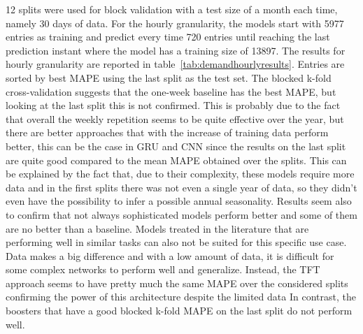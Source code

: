 12 splits were used for block validation with a test size of a month each time, namely 30 days of data.
For the hourly granularity, the models start with 5977 entries as training and predict every time 720 entries until reaching the last prediction instant where the model has a training size of 13897.
The results for hourly granularity are reported in table~\ref{tab:demandhourlyresults}.
Entries are sorted by best MAPE using the last split as the test set.
The blocked k-fold cross-validation suggests that the one-week baseline has the best MAPE, but looking at the last split this is not confirmed.
This is probably due to the fact that overall the weekly repetition seems to be quite effective over the year, but there are better approaches that with the increase of training data perform better, this can be the case in GRU and CNN since the results on the last split are quite good compared to the mean MAPE obtained over the splits.
This can be explained by the fact that, due to their complexity, these models require more data and in the first splits there was not even a single year of data, so they didn't even have the possibility to infer a possible annual seasonality.
Results seem also to confirm that not always sophisticated models perform better and some of them are no better than a baseline.
Models treated in the literature that are performing well in similar tasks can also not be suited for this specific use case.
Data makes a big difference and with a low amount of data, it is difficult for some complex networks to perform well and generalize.
Instead, the TFT approach seems to have pretty much the same MAPE over the considered splits confirming the power of this architecture despite the limited data
In contrast, the boosters that have a good blocked k-fold MAPE on the last split do not perform well.

